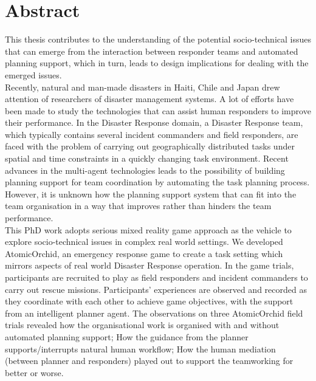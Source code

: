 \begingroup
\let\clearpage\relax
\let\cleardoublepage\relax
\let\cleardoublepage\relax

\chapter*{Abstract}
This thesis contributes to the understanding of the potential socio-technical issues that can emerge from the interaction between responder teams and automated planning support, which in turn, leads to design implications for dealing with the emerged issues. \\

Recently, natural and man-made disasters in Haiti, Chile and Japan drew attention of researchers of disaster management systems. A lot of efforts have been made to study the technologies that can assist human responders to improve their performance. In the Disaster Response domain,  a Disaster Response team, which typically contains several incident commanders and field responders, are faced with the problem of carrying out geographically distributed tasks under spatial and time constraints in a quickly changing task environment. Recent advances in the multi-agent technologies leads to the possibility of building planning support for team coordination by automating the task planning process. However, it is unknown how the planning support system that can fit into the team organisation in a way that improves rather than hinders the team performance.\\

This PhD work adopts serious mixed reality game approach as the vehicle to explore socio-technical issues in complex real world settings. We developed AtomicOrchid, an emergency response game to create a task setting which mirrors aspects of real world Disaster Response operation. In the game trials, participants are recruited to play as field responders and incident commanders to carry out rescue missions. Participants' experiences are observed and recorded as they coordinate with each other to achieve game objectives, with the support from an intelligent planner agent. The observations on three AtomicOrchid field trials revealed how the organisational work is organised with and without automated planning support; How the guidance from the planner supports/interrupts natural human workflow; How the human mediation (between planner and responders) played out to support the teamworking for better or worse. \\

